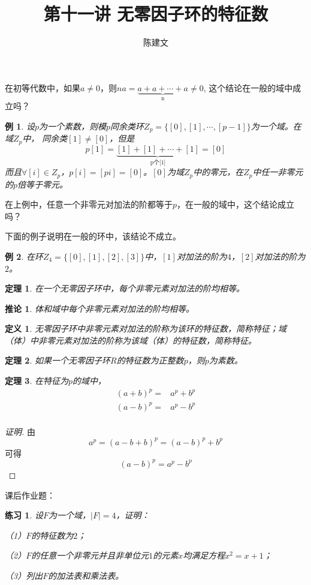 \documentclass{article}
\newtheorem{Def}{定义}
\newtheorem{Thm}{定理}
\newtheorem{Cor}{推论}
\newtheorem{Exercise}{练习}
\newtheorem*{Example}{例}
\begin{document}
\begin{CJK*}{UTF8}{gbsn}
  \title{第十一讲 无零因子环的特征数}
  \author{陈建文}
  \maketitle
  

在初等代数中，如果$a\neq 0$，则$na=\underbrace{a+a+\cdots+a}_\text{n}\neq 0$,
这个结论在一般的域中成立吗？

\begin{Example}
  设$p$为一个素数，则模$p$同余类环$Z_p=\{[0],[1],\cdots,[p-1]\}$为一个域。在域$Z_p$中，
  同余类$[1]\neq [0]$，但是
  \[p[1]=\underbrace{[1]+[1]+\cdots+[1]}_\text{p个[1]}=[0]\]
  而且$\forall [i]\in Z_p$，$p[i]=[pi]=[0]$。$[0]$为域$Z_p$中的零元，在$Z_p$中任一非零元的$p$倍等于零元。
\end{Example}

在上例中，任意一个非零元对加法的阶都等于$p$，在一般的域中，这个结论成立吗？

下面的例子说明在一般的环中，该结论不成立。

\begin{Example}
  在环$Z_4=\{[0],[1],[2],[3]\}$中，$[1]$对加法的阶为$4$，$[2]$对加法的阶为$2$。
\end{Example}

\begin{Thm}
在一个无零因子环中，每个非零元素对加法的阶均相等。
\end{Thm}

\begin{Cor}
  体和域中每个非零元素对加法的阶均相等。
\end{Cor}

\begin{Def}
  无零因子环中非零元素对加法的阶称为该环的特征数，简称特征；域（体）中非零元素对加法的阶称为该域（体）的特征数，简称特征。
\end{Def}

\begin{Thm}
  如果一个无零因子环$R$的特征数为正整数$p$，则$p$为素数。
\end{Thm}

\begin{Thm}
  在特征为$p$的域中，
  \begin{align*}
    (a+b)^p=&a^p+b^p\\
    (a-b)^p=&a^p-b^p\\
  \end{align*}
\end{Thm}
\begin{proof}[证明]

由
  \[a^p=(a-b+b)^p=(a-b)^p+b^p\]
可得
\[(a-b)^p=a^p-b^p\]
\end{proof}
课后作业题：
\begin{Exercise}
设$F$为一个域，$|F|=4$，证明：

（1）$F$的特征数为$2$；

（2）$F$的任意一个非零元并且非单位元$1$的元素$x$均满足方程$x^2=x+1$；

（3）列出$F$的加法表和乘法表。
\end{Exercise}


\end{CJK*}
\end{document}
